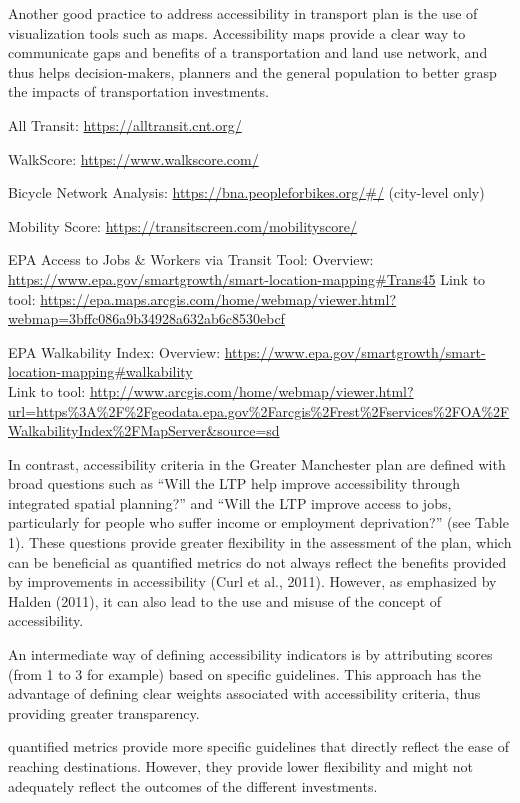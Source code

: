 \documentclass[12pt,]{article}
\begin{document}
Another good practice to address accessibility in transport plan is the
use of visualization tools such as maps. Accessibility maps provide a
clear way to communicate gaps and benefits of a transportation and land
use network, and thus helps decision-makers, planners and the general
population to better grasp the impacts of transportation investments.

All Transit: \url{https://alltransit.cnt.org/}

WalkScore: \url{https://www.walkscore.com/}

Bicycle Network Analysis: \url{https://bna.peopleforbikes.org/\#/}
(city-level only)

Mobility Score: \url{https://transitscreen.com/mobilityscore/}

EPA Access to Jobs \& Workers via Transit Tool: Overview:
\url{https://www.epa.gov/smartgrowth/smart-location-mapping\#Trans45}
Link to tool:
\url{https://epa.maps.arcgis.com/home/webmap/viewer.html?webmap=3bffc086a9b34928a632ab6c8530ebcf}

EPA Walkability Index: Overview:
\url{https://www.epa.gov/smartgrowth/smart-location-mapping\#walkability}\\
Link to tool:
\url{http://www.arcgis.com/home/webmap/viewer.html?url=https\%3A\%2F\%2Fgeodata.epa.gov\%2Farcgis\%2Frest\%2Fservices\%2FOA\%2FWalkabilityIndex\%2FMapServer\&source=sd}

In contrast, accessibility criteria in the Greater Manchester plan are
defined with broad questions such as ``Will the LTP help improve
accessibility through integrated spatial planning?'' and ``Will the LTP
improve access to jobs, particularly for people who suffer income or
employment deprivation?'' (see Table 1). These questions provide greater
flexibility in the assessment of the plan, which can be beneficial as
quantified metrics do not always reflect the benefits provided by
improvements in accessibility (Curl et al., 2011). However, as
emphasized by Halden (2011), it can also lead to the use and misuse of
the concept of accessibility.

An intermediate way of defining accessibility indicators is by
attributing scores (from 1 to 3 for example) based on specific
guidelines. This approach has the advantage of defining clear weights
associated with accessibility criteria, thus providing greater
transparency.

quantified metrics provide more specific guidelines that directly
reflect the ease of reaching destinations. However, they provide lower
flexibility and might not adequately reflect the outcomes of the
different investments.
\end{document}
